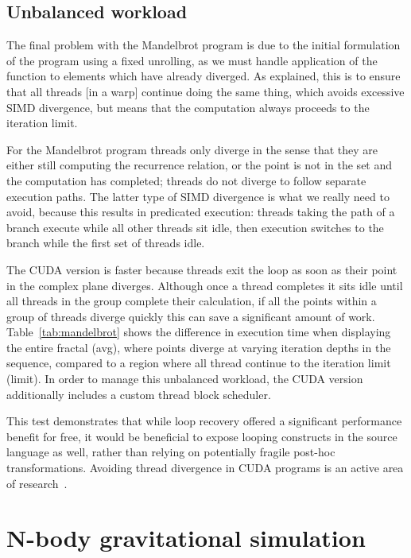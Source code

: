 \subsection{Unbalanced workload}

The final problem with the Mandelbrot program is due to the initial formulation
of the program using a fixed unrolling, as we must handle application of the
function to elements which have already diverged. As explained, this is to
ensure that all threads [in a warp] continue doing the same thing, which avoids
excessive SIMD divergence, but means that the computation always proceeds to the
iteration limit.

For the Mandelbrot program threads only diverge in the sense that they are
either still computing the recurrence relation, or the point is not in the set
and the computation has completed; threads do not diverge to follow separate
execution paths. The latter type of SIMD divergence is what we really need to
avoid, because this results in predicated execution: threads taking the
 path of a branch execute while all other threads sit idle, then
execution switches to the  branch while the first set of threads
idle.

The CUDA version is faster because threads exit the loop as soon as their point
in the complex plane diverges. Although once a thread completes it sits idle
until all threads in the group complete their calculation, if all the points
within a group of threads diverge quickly this can save a significant amount of
work. Table~\ref{tab:mandelbrot} shows the difference in execution time when
displaying the entire fractal (avg), where points diverge at varying iteration
depths in the sequence, compared to a region where all thread continue to the
iteration limit (limit). In order to manage this unbalanced workload, the CUDA
version additionally includes a custom thread block scheduler.

This test demonstrates that while loop recovery offered a significant
performance benefit for free, it would be beneficial to expose looping
constructs in the source language as well, rather than relying on potentially
fragile post-hoc transformations. Avoiding thread divergence in CUDA programs is
an active area of research~\cite{Zhang:2010jc}.

\section{N-body gravitational simulation}
\label{sec:nbody}

